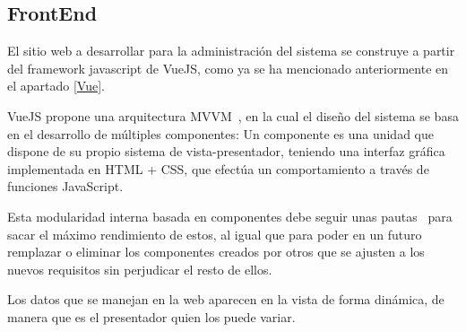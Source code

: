 \subsection{FrontEnd}

El sitio web a desarrollar para la administración del sistema se construye a partir del framework javascript de VueJS, como ya se ha mencionado anteriormente en el apartado \ref{Vue}.

VueJS propone una arquitectura MVVM~\cite{mvvm}, en la cual el diseño del sistema se basa en el desarrollo de múltiples componentes: Un componente es una unidad que dispone de su propio sistema de vista-presentador, teniendo una interfaz gráfica implementada en HTML + CSS, que efectúa un comportamiento a través de funciones JavaScript.

Esta modularidad interna basada en componentes debe seguir unas pautas~\cite{vuecomp} para sacar el máximo rendimiento de estos, al igual que para poder en un futuro remplazar o eliminar los componentes creados por otros que se ajusten a los nuevos requisitos sin perjudicar el resto de ellos.

Los datos que se manejan en la web aparecen en la vista de forma dinámica, de manera que es el presentador quien los puede variar.
